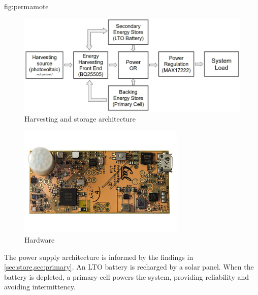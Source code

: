 \begin{definefigure}{fig:permamote}
    \centering
    \begin{subfigure}{0.7\columnwidth}
        \centering
        \includegraphics[width=\textwidth]{figs/capacity/arch}
        \caption{Harvesting and storage architecture}
    \end{subfigure}
    \begin{subfigure}{0.29\columnwidth}
        \centering
        \includegraphics[width=\textwidth,angle=90]{figs/capacity/permamote}
        \caption{Hardware}
    \end{subfigure}
    \caption{\normalfont The \name power supply architecture is informed by the
    findings in \cref{sec:store,sec:primary}. An
    LTO battery is recharged by a solar panel. When the battery is depleted,
    a primary-cell powers the system, providing reliability and avoiding
    intermittency.
    }
\end{definefigure}

